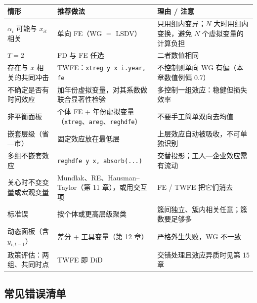 \begin{center}
\small
\begin{tabularx}{\linewidth}{@{}p{3.6cm}p{4.4cm}L@{}}
\toprule
情形 & 推荐做法 & 理由 / 注意\\
\midrule
$\alpha_i$ 可能与 $x_{it}$ 相关 & 单向 FE（WG $=$ LSDV） & 只用组内变异；$N$ 大时用组内变换，避免 $N$ 个虚拟变量的计算负担\\
$T=2$ & FD 与 FE 任选 & 二者数值相同\\
存在与 $x$ 相关的共同冲击 & TWFE：\texttt{xtreg y x i.year, fe} & 不控制则单向 WG 有偏（本章数值例偏 0.7）\\
不确定是否有时间效应 & 加年份虚拟变量，对其系数做联合显著性检验 & 多控制一组效应：稳健但损失效率\\
非平衡面板 & 个体 FE + 年份虚拟变量（\texttt{xtreg}、\texttt{areg}、\texttt{reghdfe}） & 不要手工简单双向去均值\\
嵌套层级（省—市） & 固定效应放在最低层 & 上层效应自动被吸收，不可单独识别\\
多组不嵌套效应 & \texttt{reghdfe y x, absorb(...)} & 交替投影；工人—企业效应需有流动\\
关心时不变变量或宏观变量 & Mundlak、RE、Hausman--Taylor（第 11 章），或用交互项 & FE / TWFE 把它们消去\\
标准误 & 按个体或更高层级聚类 & 簇间独立、簇内相关任意；簇数要足够多\\
动态面板（含 $y_{i,t-1}$） & 差分 + 工具变量（第 12 章） & 严格外生失败，WG 不一致\\
政策评估：两组、共同时点 & TWFE 即 DiD & 交错处理且效应异质时见第 15 章\\
\bottomrule
\end{tabularx}
\end{center}

\subsection{常见错误清单}

